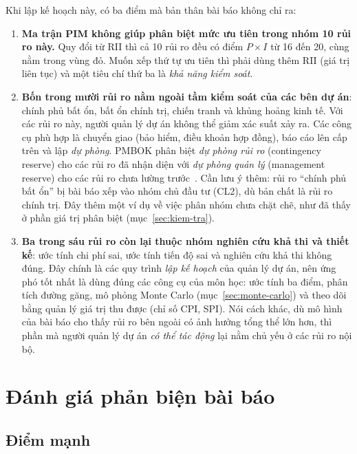 Khi lập kế hoạch này, có ba điểm mà bản thân bài báo không chỉ ra:
\begin{enumerate}
  \item \textbf{Ma trận PIM không giúp phân biệt mức ưu tiên trong nhóm 10 rủi ro này.} Quy đổi từ RII thì cả 10 rủi ro đều có điểm $P \times I$ từ 16 đến 20, cùng nằm trong vùng đỏ. Muốn xếp thứ tự ưu tiên thì phải dùng thêm RII (giá trị liên tục) và một tiêu chí thứ ba là \emph{khả năng kiểm soát}.
  \item \textbf{Bốn trong mười rủi ro nằm ngoài tầm kiểm soát của các bên dự án}: chính phủ bất ổn, bất ổn chính trị, chiến tranh và khủng hoảng kinh tế. Với các rủi ro này, người quản lý dự án không thể giảm xác suất xảy ra. Các công cụ phù hợp là chuyển giao (bảo hiểm, điều khoản hợp đồng), báo cáo lên cấp trên và lập \emph{dự phòng}. PMBOK phân biệt \emph{dự phòng rủi ro} (contingency reserve) cho các rủi ro đã nhận diện với \emph{dự phòng quản lý} (management reserve) cho các rủi ro chưa lường trước~\cite{pmbok6}. Cần lưu ý thêm: rủi ro ``chính phủ bất ổn'' bị bài báo xếp vào nhóm chủ đầu tư (CL2), dù bản chất là rủi ro chính trị. Đây thêm một ví dụ về việc phân nhóm chưa chặt chẽ, như đã thấy ở phần giá trị phân biệt (mục~\ref{sec:kiem-tra}).
  \item \textbf{Ba trong sáu rủi ro còn lại thuộc nhóm nghiên cứu khả thi và thiết kế}: ước tính chi phí sai, ước tính tiến độ sai và nghiên cứu khả thi không đúng. Đây chính là các quy trình \emph{lập kế hoạch} của quản lý dự án, nên ứng phó tốt nhất là dùng đúng các công cụ của môn học: ước tính ba điểm, phân tích đường găng, mô phỏng Monte Carlo (mục~\ref{sec:monte-carlo}) và theo dõi bằng quản lý giá trị thu được (chỉ số CPI, SPI). Nói cách khác, dù mô hình của bài báo cho thấy rủi ro bên ngoài có ảnh hưởng tổng thể lớn hơn, thì phần mà người quản lý dự án \emph{có thể tác động} lại nằm chủ yếu ở các rủi ro nội bộ.
\end{enumerate}

\section{Đánh giá phản biện bài báo}
\label{sec:phan-bien}

\subsection{Điểm mạnh}

